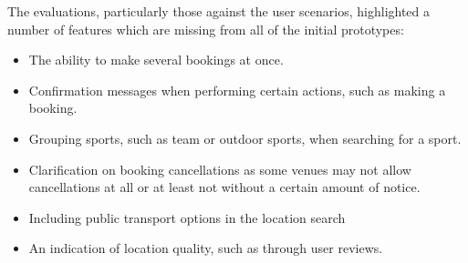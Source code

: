 The evaluations, particularly those against the user scenarios, highlighted a
number of features which are missing from all of the initial prototypes:

\begin{itemize}
	\item The ability to make several bookings at once.
	\item Confirmation messages when performing certain actions, such as making
		a booking.
	\item Grouping sports, such as team or outdoor sports, when searching for a
		sport.
	\item Clarification on booking cancellations as some venues may not allow
		cancellations at all or at least not without a certain amount of
		notice.
	\item Including public transport options in the location search
	\item An indication of location quality, such as through user reviews.
\end{itemize}
\restoregeometry%
